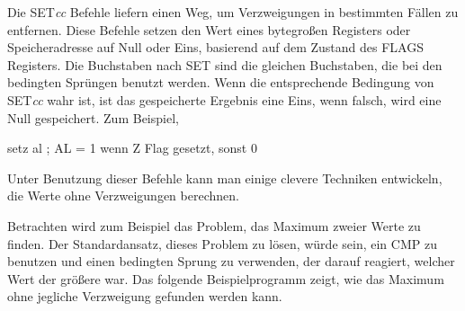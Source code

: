 Die {\code SET\emph{cc}} Befehle
liefern einen Weg, um Verzweigungen in bestimmten F\"{a}llen zu
entfernen. Diese Befehle setzen den Wert eines bytegro{\ss}en Registers
oder Speicheradresse auf Null oder Eins, basierend auf dem Zustand
des FLAGS Registers. Die Buchstaben nach {\code SET} sind die
gleichen Buchstaben, die bei den bedingten Spr\"{u}ngen benutzt werden.
Wenn die entsprechende Bedingung von {\code SET\emph{cc}} wahr ist,
ist das gespeicherte Ergebnis eine Eins, wenn falsch, wird eine Null
gespeichert. Zum Beispiel,
\begin{AsmCodeListing}[frame=none, numbers=none]
      setz   al               ; AL = 1 wenn Z Flag gesetzt, sonst 0
\end{AsmCodeListing}
Unter Benutzung dieser Befehle kann man einige clevere Techniken
entwickeln, die Werte ohne Verzweigungen berechnen.

Betrachten wird zum Beispiel das Problem, das Maximum zweier Werte
zu finden. Der Standardansatz, dieses Problem zu l\"{o}sen, w\"{u}rde sein,
ein {\code CMP} zu benutzen und einen bedingten Sprung zu verwenden,
der darauf reagiert, welcher Wert der gr\"{o}{\ss}ere war. Das folgende
Beispielprogramm zeigt, wie das Maximum ohne jegliche Verzweigung
gefunden werden kann. \pagebreak[4]

